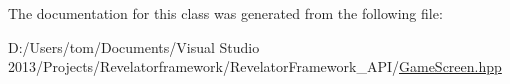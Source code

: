 The documentation for this class was generated from the following file\-:\begin{DoxyCompactItemize}
\item 
D\-:/\-Users/tom/\-Documents/\-Visual Studio 2013/\-Projects/\-Revelatorframework/\-Revelator\-Framework\-\_\-\-A\-P\-I/\hyperlink{_game_screen_8hpp}{Game\-Screen.\-hpp}\end{DoxyCompactItemize}
